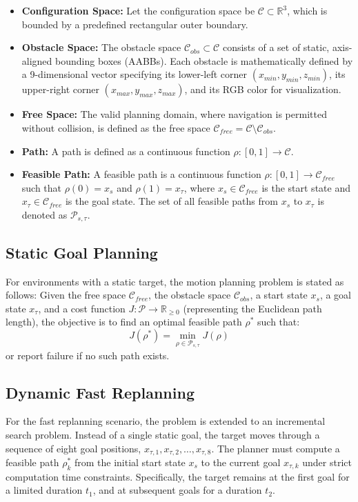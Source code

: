 \documentclass[letterpaper,journal]{IEEEtran}
\begin{document}
\begin{itemize}
    \item \textbf{Configuration Space:} Let the configuration space be $\mathcal{C} \subset \mathbb{R}^3$, which is bounded by a predefined rectangular outer boundary.
    \item \textbf{Obstacle Space:} The obstacle space $\mathcal{C}_{obs} \subset \mathcal{C}$ consists of a set of static, axis-aligned bounding boxes (AABBs). Each obstacle is mathematically defined by a 9-dimensional vector specifying its lower-left corner $(x_{min}, y_{min}, z_{min})$, its upper-right corner $(x_{max}, y_{max}, z_{max})$, and its RGB color for visualization.
    \item \textbf{Free Space:} The valid planning domain, where navigation is permitted without collision, is defined as the free space $\mathcal{C}_{free} = \mathcal{C} \setminus \mathcal{C}_{obs}$.
    \item \textbf{Path:} A path is defined as a continuous function $\rho: [0, 1] \rightarrow \mathcal{C}$.
    \item \textbf{Feasible Path:} A feasible path is a continuous function $\rho: [0, 1] \rightarrow \mathcal{C}_{free}$ such that $\rho(0) = x_s$ and $\rho(1) = x_\tau$, where $x_s \in \mathcal{C}_{free}$ is the start state and $x_\tau \in \mathcal{C}_{free}$ is the goal state. The set of all feasible paths from $x_s$ to $x_\tau$ is denoted as $\mathcal{P}_{s, \tau}$.
\end{itemize}

\subsection{Static Goal Planning}
For environments with a static target, the motion planning problem is stated as follows: Given the free space $\mathcal{C}_{free}$, the obstacle space $\mathcal{C}_{obs}$, a start state $x_s$, a goal state $x_\tau$, and a cost function $J: \mathcal{P} \rightarrow \mathbb{R}_{\ge 0}$ (representing the Euclidean path length), the objective is to find an optimal feasible path $\rho^*$ such that:
\begin{equation}
    J(\rho^*) = \min_{\rho \in \mathcal{P}_{s, \tau}} J(\rho)
\end{equation}
or report failure if no such path exists.

\subsection{Dynamic Fast Replanning}
For the fast replanning scenario, the problem is extended to an incremental search problem. Instead of a single static goal, the target moves through a sequence of eight goal positions, $x_{\tau, 1}, x_{\tau, 2}, \dots, x_{\tau, 8}$. The planner must compute a feasible path $\rho_k^*$ from the initial start state $x_s$ to the current goal $x_{\tau, k}$ under strict computation time constraints. Specifically, the target remains at the first goal for a limited duration $t_1$, and at subsequent goals for a duration $t_2$.
\end{document}

